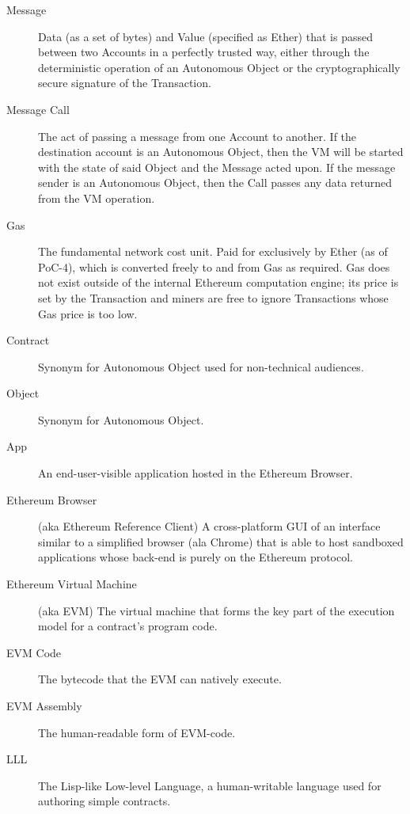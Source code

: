 \documentclass[9pt,oneside]{amsart}
\begin{document}
\begin{multicols}{2}
\begin{description}
\item[Message] Data (as a set of bytes) and Value (specified as Ether) that is passed between two Accounts in a perfectly trusted way, either through the deterministic operation of an Autonomous Object or the cryptographically secure signature of the Transaction.

\item[Message Call] The act of passing a message from one Account to another. If the destination account is an Autonomous Object, then the VM will be started with the state of said Object and the Message acted upon. If the message sender is an Autonomous Object, then the Call passes any data returned from the VM operation.

\item[Gas] The fundamental network cost unit. Paid for exclusively by Ether (as of PoC-4), which is converted freely to and from Gas as required. Gas does not exist outside of the internal Ethereum computation engine; its price is set by the Transaction and miners are free to ignore Transactions whose Gas price is too low.

\item[Contract] Synonym for Autonomous Object used for non-technical audiences.

\item[Object] Synonym for Autonomous Object.

\item[App] An end-user-visible application hosted in the Ethereum Browser.

\item[Ethereum Browser] (aka Ethereum Reference Client) A cross-platform GUI of an interface similar to a simplified browser (ala Chrome) that is able to host sandboxed applications whose back-end is purely on the Ethereum protocol.

\item[Ethereum Virtual Machine] (aka EVM) The virtual machine that forms the key part of the execution model for a contract's program code.

\item[EVM Code] The bytecode that the EVM can natively execute.

\item[EVM Assembly] The human-readable form of EVM-code.

\item[LLL] The Lisp-like Low-level Language, a human-writable language used for authoring simple contracts.


\end{description}
\end{multicols}
\end{document}
